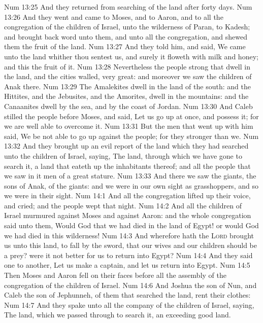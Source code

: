 \vs Num 13:25 And they returned from searching of the land after forty days.
\vs Num 13:26 And they went and came to Moses, and to Aaron, and to all the congregation of the children of Israel, unto the wilderness of Paran, to Kadesh; and brought back word unto them, and unto all the congregation, and shewed them the fruit of the land.
\vs Num 13:27 And they told him, and said, We came unto the land whither thou sentest us, and surely it floweth with milk and honey; and this  the fruit of it.
\vs Num 13:28 Nevertheless the people  strong that dwell in the land, and the cities  walled,  very great: and moreover we saw the children of Anak there.
\vs Num 13:29 The Amalekites dwell in the land of the south: and the Hittites, and the Jebusites, and the Amorites, dwell in the mountains: and the Canaanites dwell by the sea, and by the coast of Jordan.
\vs Num 13:30 And Caleb stilled the people before Moses, and said, Let us go up at once, and possess it; for we are well able to overcome it.
\vs Num 13:31 But the men that went up with him said, We be not able to go up against the people; for they  stronger than we.
\vs Num 13:32 And they brought up an evil report of the land which they had searched unto the children of Israel, saying, The land, through which we have gone to search it,  a land that eateth up the inhabitants thereof; and all the people that we saw in it  men of a great stature.
\vs Num 13:33 And there we saw the giants, the sons of Anak,  of the giants: and we were in our own sight as grasshoppers, and so we were in their sight.
\vs Num 14:1 And all the congregation lifted up their voice, and cried; and the people wept that night.
\vs Num 14:2 And all the children of Israel murmured against Moses and against Aaron: and the whole congregation said unto them, Would God that we had died in the land of Egypt! or would God we had died in this wilderness!
\vs Num 14:3 And wherefore hath the \textsc{Lord} brought us unto this land, to fall by the sword, that our wives and our children should be a prey? were it not better for us to return into Egypt?
\vs Num 14:4 And they said one to another, Let us make a captain, and let us return into Egypt.
\vs Num 14:5 Then Moses and Aaron fell on their faces before all the assembly of the congregation of the children of Israel.
\vs Num 14:6 And Joshua the son of Nun, and Caleb the son of Jephunneh,  of them that searched the land, rent their clothes:
\vs Num 14:7 And they spake unto all the company of the children of Israel, saying, The land, which we passed through to search it,  an exceeding good land.

